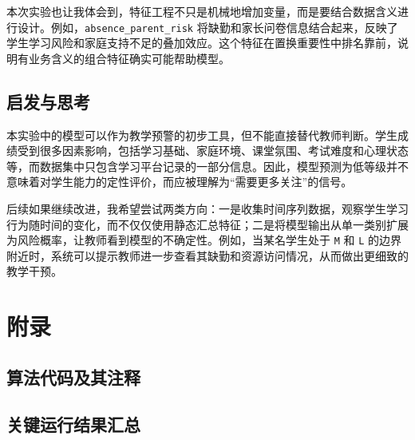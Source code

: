 \documentclass[UTF8,a4paper,12pt]{ctexart}
\begin{document}
本次实验也让我体会到，特征工程不只是机械地增加变量，而是要结合数据含义进行设计。例如，\texttt{absence\_parent\_risk} 将缺勤和家长问卷信息结合起来，反映了学生学习风险和家庭支持不足的叠加效应。这个特征在置换重要性中排名靠前，说明有业务含义的组合特征确实可能帮助模型。

\subsection{启发与思考}

本实验中的模型可以作为教学预警的初步工具，但不能直接替代教师判断。学生成绩受到很多因素影响，包括学习基础、家庭环境、课堂氛围、考试难度和心理状态等，而数据集中只包含学习平台记录的一部分信息。因此，模型预测为低等级并不意味着对学生能力的定性评价，而应被理解为“需要更多关注”的信号。

后续如果继续改进，我希望尝试两类方向：一是收集时间序列数据，观察学生学习行为随时间的变化，而不仅仅使用静态汇总特征；二是将模型输出从单一类别扩展为风险概率，让教师看到模型的不确定性。例如，当某名学生处于 \texttt{M} 和 \texttt{L} 的边界附近时，系统可以提示教师进一步查看其缺勤和资源访问情况，从而做出更细致的教学干预。

\section{附录}

\subsection*{算法代码及其注释}


\subsection*{关键运行结果汇总}
\end{document}

